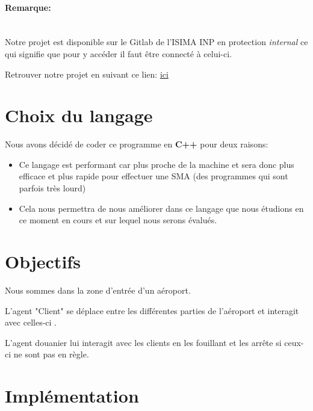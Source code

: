 \documentclass[12pt,french]{article} %
\begin{document}
 \bigskip
 

\paragraph{Remarque:\\\\}
 

Notre projet est disponible sur le Gitlab de l'ISIMA INP en protection \textit{internal} ce qui signifie que pour y accéder il faut être connecté à celui-ci.

Retrouver notre projet en suivant ce lien: \href{https://gitlab.isima.fr/liballejos/smairport}{ici}

\newpage

\section{Choix du langage}

Nous avons décidé de coder ce programme en \textbf{C++} pour deux raisons:

\medskip

\begin{itemize}
	\item Ce langage est performant car plus proche de la machine et sera donc plus efficace et plus rapide pour effectuer une SMA (des programmes qui sont parfois très lourd)
	
	\item Cela nous permettra de nous améliorer dans ce langage que nous étudions en ce moment en cours et sur lequel nous serons évalués.
\end{itemize}


\section{Objectifs}

Nous sommes dans la zone d'entrée d'un aéroport.

L'agent "Client" se déplace entre les différentes parties de l'aéroport et interagit avec celles-ci .

L'agent douanier lui interagit avec les clients en les fouillant et les arrête si ceux-ci ne sont pas en règle.


\section{Implémentation}
\end{document}
